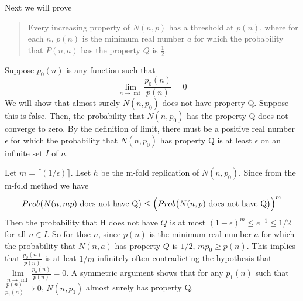\documentclass[a4paper, 12pt]{mcshw}
\begin{document}
\begin{enumerate}
\begin{solution}
            Next we will prove
            \begin{quote}
                Every increasing property of $N(n, p)$ has a threshold at $p(n)$, where for each $n$, $p(n)$ is the minimum real number $a$ for which the probability that $P(n, a)$ has the property $Q$ is $\frac{1}{2}$.
            \end{quote}
            Suppose $p_0(n)$ is any function such that
            $$\lim_{n\to\inf}\frac{p_0(n)}{p(n)} = 0$$
            We will show that almost surely $N(n, p_0)$ does not have property Q. Suppose this is false. Then, the probability that $N(n, p_0)$ has the property Q does not converge to zero. By the definition of limit, there must be a positive real number $\epsilon$ for which the probability that $N(n, p_0)$ has property Q is at least $\epsilon$ on an infinite set $I$ of $n$. 
            
            Let $m = \lceil (1/\epsilon) \rceil$. Lset $h$ be the m-fold replication of $N(n, p_0)$. Since from the m-fold method we have
            $$Prob\bigl(N(n, mp)\text{ does not have Q}\bigr) \leq {\Bigl(Prob\bigl(N(n, p)\text{ does not have Q}\bigr)\Bigr)}^m$$
            Then the probability that H does not have $Q$ is at most ${(1 - \epsilon)}^m \leq e^{-1} \leq 1/2$ for all $n \in I$. So for thse $n$, since $p(n)$ is the minimum real number $a$ for which the probability that $N(n, a)$ has property $Q$ is $1/2$, $mp_0 \geq p(n)$. This implies that $\frac{p_0(n)}{p(n)}$ is at leat $1/m$ infinitely often contradicting the hypothesis that $\lim\limits_{n\to\inf}\frac{p_0(n)}{p(n)} = 0$. A symmetric argument shows that for any $p_1(n)$ such that $\frac{p(n)}{p_1(n)}\to 0$, $N(n,p_1)$ almost surely has property Q.
        \end{solution}
\end{enumerate}
\end{document}
